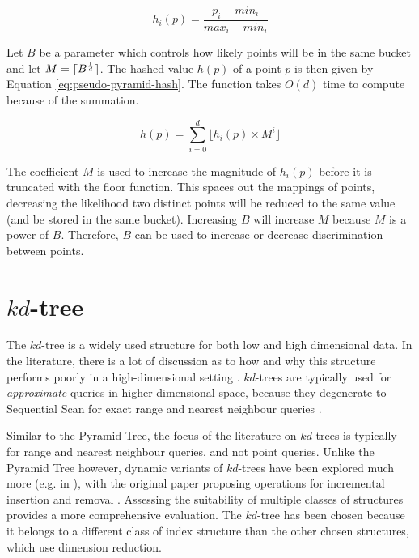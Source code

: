 \begin{equation}
	h_i(p) = \frac{p_i - min_i}{max_i - min_i}
	\label{eq:point-boundary-distance}
\end{equation}

Let $B$ be a parameter which controls how likely points will be in the same bucket and let $M = \lceil B^{\frac{1}{d}}\rceil$. The hashed value $h(p)$ of a point $p$ is then given by Equation \ref{eq:pseudo-pyramid-hash}. The function takes $O(d)$ time to compute because of the summation.

\begin{equation}
	h(p) = \sum_{i = 0}^{d} { \lfloor h_i(p) \times M^{i} \rfloor }
	\label{eq:pseudo-pyramid-hash}
\end{equation}

The coefficient $M$ is used to increase the magnitude of $h_i(p)$ before it is truncated with the floor function. This spaces out the mappings of points, decreasing the likelihood two distinct points will be reduced to the same value (and be stored in the same bucket). Increasing $B$ will increase $M$ because $M$ is a power of $B$. Therefore, $B$ can be used to increase or decrease discrimination between points.

\section{$kd$-tree}
\label{sec:kd-tree-detail}

The $kd$-tree is a widely used structure for both low and high dimensional data. In the literature, there is a lot of discussion as to how and why this structure performs poorly in a high-dimensional setting \cite{highd-nn, search-highd-analysis}. $kd$-trees are typically used for \textit{approximate} queries in higher-dimensional space, because they degenerate to Sequential Scan for exact range and nearest neighbour queries \cite{similarity-searching}. 

Similar to the Pyramid Tree, the focus of the literature on $kd$-trees is typically for range and nearest neighbour queries, and not point queries. Unlike the Pyramid Tree however, dynamic variants of $kd$-trees have been explored much more (e.g. in \cite{bkd-tree, kdb-tree}), with the original paper proposing operations for incremental insertion and removal \cite{kd-tree}. Assessing the suitability of multiple classes of structures provides a more comprehensive evaluation. The $kd$-tree has been chosen because it belongs to a different class of index structure than the other chosen structures, which use dimension reduction.

